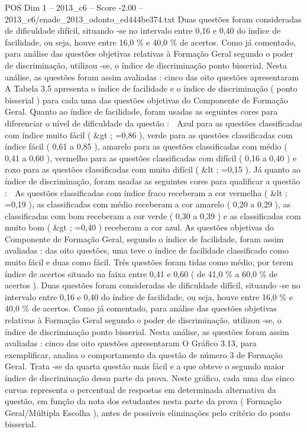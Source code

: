 \begin{textsample}{POS Dim 1 – 2013\_c6 – Score -2.00 – 2013\_c6/enade\_2013\_odonto\_ed444be374.txt}
Duas questões foram consideradas de dificuldade difícil, situando -se no intervalo entre 0,16 e 0,40 do índice de facilidade, ou seja, houve entre 16,0 \% e 40,0 \% de acertos.
Como já comentado, para análise das questões objetivas relativas à Formação Geral segundo o poder de discriminação, utilizou -se, o índice de discriminação ponto bisserial.
Nesta análise, as questões foram assim avaliadas : cinco das oito questões apresentaram A Tabela 3.5 apresenta o índice de facilidade e o índice de discriminação ( ponto bisserial ) para cada uma das questões objetivas do Componente de Formação Geral.
Quanto ao índice de facilidade, foram usadas as seguintes cores para diferenciar o nível de dificuldade da questão :  Azul para as questões classificadas com índice muito fácil ( \&gt ; =0,86 ), verde para as questões classificadas com índice fácil ( 0,61 a 0,85 ), amarelo para as questões classificadas com médio ( 0,41 a 0,60 ), vermelho para as questões classificadas com difícil ( 0,16 a 0,40 ) e roxo para as questões classificadas com muito difícil ( \&lt ; =0,15 ).
Já quanto ao índice de discriminação, foram usadas as seguintes cores para qualificar a questão :  As questões classificadas com índice fraco receberam a cor vermelha ( \&lt ; =0,19 ), as classificadas com médio receberam a cor amarelo ( 0,20 a 0,29 ), as classificadas com bom receberam a cor verde ( 0,30 a 0,39 ) e as classificadas com muito bom ( \&gt ; =0,40 ) receberam a cor azul.
As questões objetivas do Componente de Formação Geral, segundo o índice de facilidade, foram assim avaliadas : das oito questões, uma teve o índice de facilidade classificado como muito fácil e duas como fácil.
Três questões foram tidas como médio, por terem índice de acertos situado na faixa entre 0,41 e 0,60 ( de 41,0 \% a 60,0 \% de acertos ).
Duas questões foram consideradas de dificuldade difícil, situando -se no intervalo entre 0,16 e 0,40 do índice de facilidade, ou seja, houve entre 16,0 \% e 40,0 \% de acertos.
Como já comentado, para análise das questões objetivas relativas à Formação Geral segundo o poder de discriminação, utilizou -se, o índice de discriminação ponto bisserial.
Nesta análise, as questões foram assim avaliadas : cinco das oito questões apresentaram O Gráfico 3.13, para exemplificar, analisa o comportamento da questão de número 3 de Formação Geral.
Trata -se da quarta questão mais fácil e a que obteve o segundo maior índice de discriminação dessa parte da prova.
Neste gráfico, cada uma das cinco curvas representa o percentual de respostas em determinada alternativa da questão, em função da nota dos estudantes nesta parte da prova ( Formação Geral/Múltipla Escolha ), antes de possíveis eliminações pelo critério do ponto bisserial.

\end{textsample}
